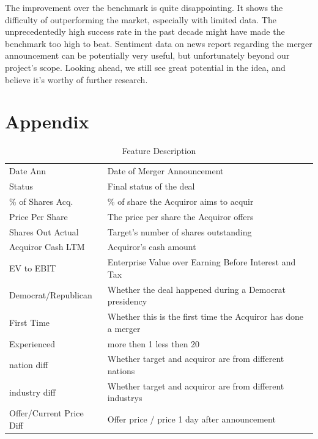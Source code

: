 \documentclass[12pt]{article}
\begin{document}
The improvement over the benchmark is quite disappointing. It shows the difficulty of outperforming the market, especially with limited data. The unprecedentedly high success rate in the past decade might have made the benchmark too high to beat. Sentiment data on news report regarding the merger announcement can be potentially very useful, but unfortunately beyond our project's scope. Looking ahead, we still see great potential in the idea, and believe it's worthy of further research. 

\newpage 
\section{Appendix }
\label{sec:tables}

\begin{table}[h]
\caption{Feature Description}
\begin{tabular}{ll}
Date Ann                 & Date of Merger Announcement                                  \\
Status                   & Final status of the deal                                     \\
\% of Shares Acq.        & \% of share the Acquiror aims to acquir                      \\
Price Per Share          & The price per share the Acquiror offers                      \\
Shares Out Actual        & Target's number of shares outstanding                        \\
Acquiror Cash LTM        & Acquiror's cash amount                                       \\
EV to EBIT               & Enterprise Value over Earning Before Interest and Tax        \\
Democrat/Republican      & Whether the deal happened during a Democrat presidency       \\
First Time               & Whether this is the first time the Acquiror has done a merger \\
Experienced              & more then 1 less then 20                            \\
nation diff              & Whether target and acquiror are from different nations       \\
industry diff            & Whether target and acquiror are from different industrys     \\
Offer/Current Price Diff & Offer price / price 1 day after announcement                 \\

\end{tabular}
\end{table}
\end{document}
